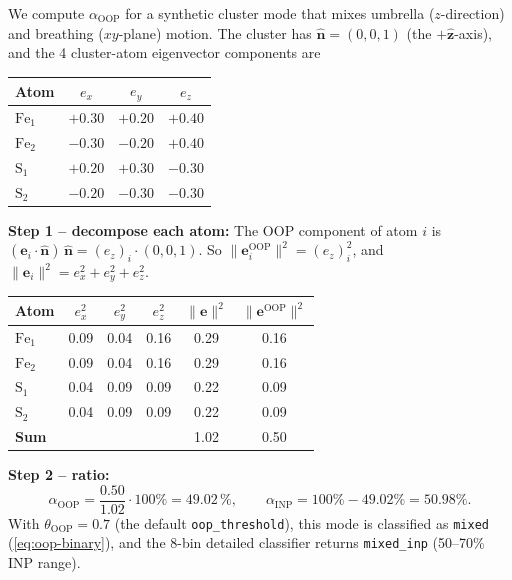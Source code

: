 \documentclass[10pt,a4paper,twoside]{article}
\newcommand{\evec}{\mathbf{e}}
\newcommand{\zhat}{\hat{\mathbf{z}}}
\newcommand{\nhat}{\hat{\mathbf{n}}}
\newcommand{\OOP}{\mathrm{OOP}}
\newcommand{\INP}{\mathrm{INP}}
\newcommand{\cfgkey}[1]{\texttt{#1}}
\begin{document}
\begin{workedexample}
We compute $\alpha_{\OOP}$ for a synthetic cluster mode that
mixes umbrella ($z$-direction) and breathing ($xy$-plane) motion.
The cluster has $\nhat = (0, 0, 1)$ (the $+\zhat$-axis), and the
4 cluster-atom eigenvector components are
\begin{center}
\begin{tabular}{lccc}
\toprule
Atom    & $e_x$    & $e_y$    & $e_z$ \\
\midrule
$\text{Fe}_1$ & $+0.30$  & $+0.20$  & $+0.40$ \\
$\text{Fe}_2$ & $-0.30$  & $-0.20$  & $+0.40$ \\
$\text{S}_1$  & $+0.20$  & $+0.30$  & $-0.30$ \\
$\text{S}_2$  & $-0.20$  & $-0.30$  & $-0.30$ \\
\bottomrule
\end{tabular}
\end{center}

\textbf{Step 1 -- decompose each atom:}
The OOP component of atom $i$ is $(\evec_i \cdot \nhat)\,\nhat
= (e_z)_i \cdot (0,0,1)$. So
$\lVert\evec_i^{\OOP}\rVert^2 = (e_z)_i^2$, and
$\lVert\evec_i\rVert^2 = e_x^2 + e_y^2 + e_z^2$.

\begin{center}
\begin{tabular}{lccccc}
\toprule
Atom & $e_x^2$ & $e_y^2$ & $e_z^2$ & $\lVert\evec\rVert^2$
                                    & $\lVert\evec^{\OOP}\rVert^2$ \\
\midrule
$\text{Fe}_1$ & 0.09 & 0.04 & 0.16 & 0.29 & 0.16 \\
$\text{Fe}_2$ & 0.09 & 0.04 & 0.16 & 0.29 & 0.16 \\
$\text{S}_1$  & 0.04 & 0.09 & 0.09 & 0.22 & 0.09 \\
$\text{S}_2$  & 0.04 & 0.09 & 0.09 & 0.22 & 0.09 \\
\midrule
\textbf{Sum}  &      &      &      & 1.02 & 0.50 \\
\bottomrule
\end{tabular}
\end{center}

\textbf{Step 2 -- ratio:}
\[
  \alpha_{\OOP} = \frac{0.50}{1.02} \cdot 100\%
    = \boxed{49.02\,\%},
  \qquad
  \alpha_{\INP} = 100\% - 49.02\% = 50.98\%.
\]
With $\theta_{\OOP} = 0.7$ (the default \cfgkey{oop\_threshold}),
this mode is classified as \texttt{mixed} (\cref{eq:oop-binary}),
and the 8-bin detailed classifier returns
\texttt{mixed\_inp} (50--70\% INP range).


\end{workedexample}
\end{document}
